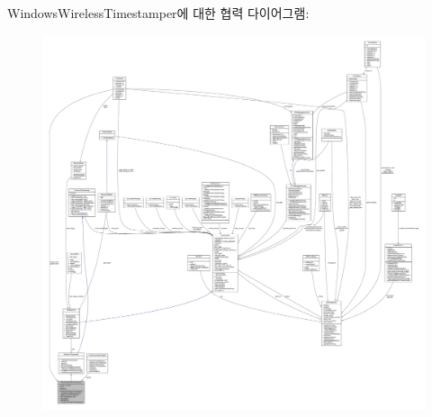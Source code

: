 Windows\+Wireless\+Timestamper에 대한 협력 다이어그램\+:
\nopagebreak
\begin{figure}[H]
\begin{center}
\leavevmode
\includegraphics[width=350pt]{class_windows_wireless_timestamper__coll__graph}
\end{center}
\end{figure}
